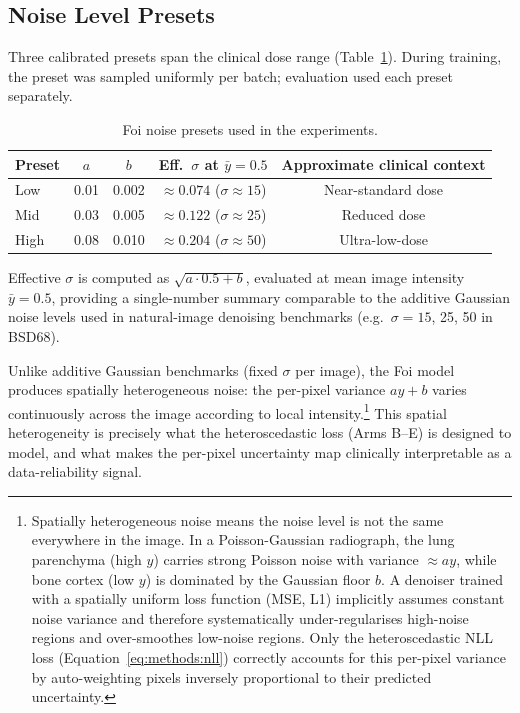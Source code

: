\documentclass[12pt, a4paper, twoside, openright]{book}
\begin{document}
\subsection{Noise Level Presets}
\label{sec:methods:noise:presets}

Three calibrated presets span the clinical dose range (Table~\ref{tab:methods:noise_presets}). During training, the preset was sampled uniformly per batch; evaluation used each preset separately.
\begin{table}[htbp]
\centering
\caption{Foi noise presets used in the experiments.}
\label{tab:methods:noise_presets}
\begin{threeparttable}
\begin{tabular}{lcccc}
\toprule
\textbf{Preset} & \textbf{$a$} & \textbf{$b$} & \textbf{Eff.\ $\sigma$ at $\bar{y}=0.5$} & \textbf{Approximate clinical context} \\
\midrule
Low   & 0.01 & 0.002 & $\approx 0.074$ ($\sigma \approx 15$) & Near-standard dose \\
Mid   & 0.03 & 0.005 & $\approx 0.122$ ($\sigma \approx 25$) & Reduced dose \\
High  & 0.08 & 0.010 & $\approx 0.204$ ($\sigma \approx 50$) & Ultra-low-dose \\
\bottomrule
\end{tabular}
\begin{tablenotes}
\footnotesize
\item Effective $\sigma$ is computed as $\sqrt{a \cdot 0.5 + b}$, evaluated at mean image intensity $\bar{y} = 0.5$, providing a single-number summary comparable to the additive Gaussian noise levels used in natural-image denoising benchmarks (e.g.\ $\sigma = 15$, 25, 50 in BSD68).
\end{tablenotes}
\end{threeparttable}
\end{table}

Unlike additive Gaussian benchmarks (fixed $\sigma$ per image), the Foi model produces spatially heterogeneous noise: the per-pixel variance $ay + b$ varies continuously across the image according to local intensity.\footnote{Spatially heterogeneous noise means the noise level is not the same everywhere in the image. In a Poisson-Gaussian radiograph, the lung parenchyma (high $y$) carries strong Poisson noise with variance $\approx ay$, while bone cortex (low $y$) is dominated by the Gaussian floor $b$. A denoiser trained with a spatially uniform loss function (MSE, L1) implicitly assumes constant noise variance and therefore systematically under-regularises high-noise regions and over-smoothes low-noise regions. Only the heteroscedastic NLL loss (Equation~\ref{eq:methods:nll}) correctly accounts for this per-pixel variance by auto-weighting pixels inversely proportional to their predicted uncertainty.} This spatial heterogeneity is precisely what the heteroscedastic loss (Arms B--E) is designed to model, and what makes the per-pixel uncertainty map clinically interpretable as a data-reliability signal.
\end{document}
